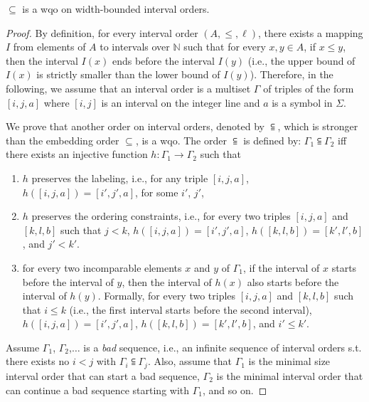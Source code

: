 \begin{lemma}
$\subseteq$ is a wqo on width-bounded interval orders.
\end{lemma}
\begin{proof}
By definition, for every interval order $(A,\leq,\ell)$, there exists a mapping $I$ from elements of $A$ to intervals over $\mathbb{N}$ such that for every $x,y\in A$, if $x\leq y$, then the interval $I(x)$ ends before the interval $I(y)$ (i.e., the upper bound of $I(x)$ is strictly smaller than the lower bound of $I(y)$). %
Therefore, in the following, we assume that an interval order is a multiset $\Gamma$ of triples of the form $[i,j,a]$ where $[i,j]$ is an interval on the integer line and $a$ is a symbol in $\Sigma$.

We prove that another order on interval orders, denoted by $\subseteqq$, which is stronger than the embedding order $\subseteq$, is a wqo. The order $\subseteqq$ is defined by: $\Gamma_1\subseteqq \Gamma_2$ iff there exists an injective function $h:\Gamma_1\rightarrow \Gamma_2$ such that 
\begin{enumerate}
	\item $h$ preserves the labeling, i.e., for any triple $[i,j,a]$, $h([i,j,a])=[i',j',a]$, for some $i'$, $j'$, 
	\item $h$ preserves the ordering constraints, i.e., for every two triples $[i,j,a]$ and $[k,l,b]$ such that $j< k$, $h([i,j,a])=[i',j',a]$, $h([k,l,b])=[k',l',b]$, and $j'< k'$.
	\item for every two incomparable elements $x$ and $y$ of $\Gamma_1$, if the interval of $x$ starts before the interval of $y$, then the interval of $h(x)$ also starts before the interval of $h(y)$. Formally, for every two triples $[i,j,a]$ and $[k,l,b]$ such that $i\leq k$ (i.e., the first interval starts before the second interval), $h([i,j,a])=[i',j',a]$, $h([k,l,b])=[k',l',b]$, and $i'\leq k'$.
\end{enumerate}
		
Assume $\Gamma_1$, $\Gamma_2$,$\ldots$ is a \emph{bad} sequence, i.e., an infinite sequence of interval orders s.t. there exists no $i < j$ with $\Gamma_i\subseteqq \Gamma_j$. Also, assume that $\Gamma_1$ is the minimal size interval order that can start a bad sequence, $\Gamma_2$ is the minimal interval order that can continue a bad sequence starting with $\Gamma_1$, and so on.


\end{proof}
